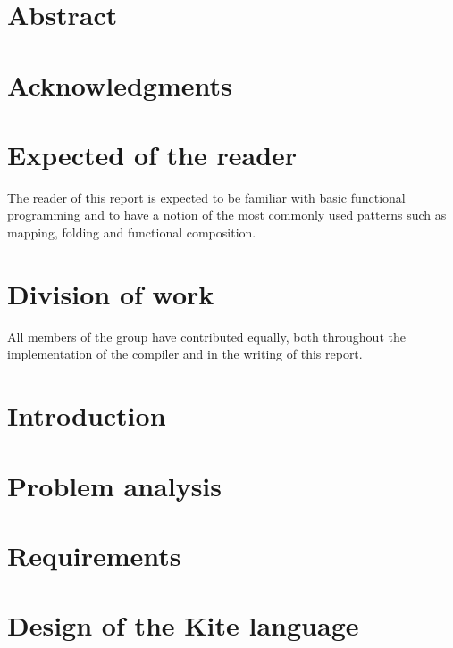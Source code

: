 \documentclass{article}
\begin{document}

\clearpage

\section*{Abstract}
\label{sec:abstract}

\clearpage

\section*{Acknowledgments}
\label{sec:acknow}


\section*{Expected of the reader}
The reader of this report is expected to be familiar with basic functional programming and to have a notion of the most commonly used patterns such as mapping, folding and functional composition.

\section*{Division of work}
All members of the group have contributed equally, both throughout the implementation of the compiler and in the writing of this report.
\clearpage

\tableofcontents
\clearpage

\section{Introduction}
\label{sec:intro}

\clearpage

\section{Problem analysis}
\label{sec:probanal}

\clearpage

\section{Requirements}
\label{sec:requirements}

\clearpage

\section{Design of the Kite language}
\label{sec:kite-design}

\clearpage
\end{document}

